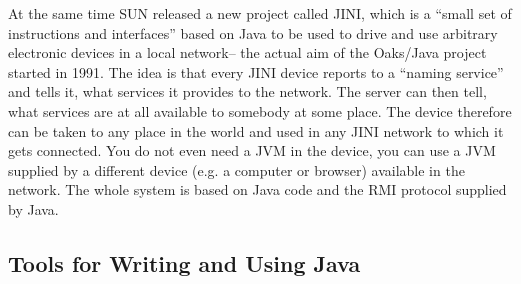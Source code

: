 At the same time SUN released a new project called JINI, which is
a ``small set of instructions and interfaces'' based on Java to
be used to drive and use arbitrary electronic devices in a local network--
the actual aim of the Oaks/Java project started in 1991. The idea is that every 
JINI device reports to a ``naming service'' and tells it, what services
it provides to the network. The server can then tell, what services are at
all available to somebody at some place. The device therefore can be 
taken to any place in the world and used in any JINI network to which
it gets connected. You do not even need a JVM in the device, you can 
use a JVM supplied by a different device (e.g. a computer or browser) 
available in the network. The whole system is based on Java code and
the RMI protocol supplied by Java.



\subsection{Tools for Writing and Using Java}

